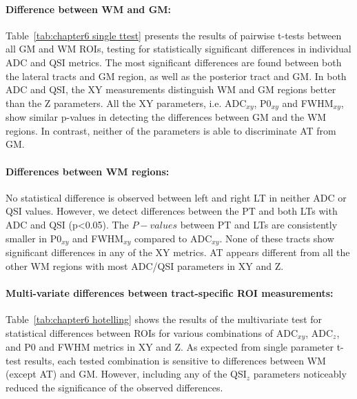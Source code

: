 \paragraph{Difference between WM and GM: }
Table~\ref{tab:chapter6 single ttest} presents the results of pairwise t-tests between all GM and WM \glspl{ROI}, testing for statistically significant differences in individual ADC and QSI metrics. The most significant differences are found between both the lateral tracts and GM region, as well as the posterior tract and GM. In both ADC and QSI, the XY measurements distinguish WM and GM regions better than the Z parameters. All the XY parameters, i.e. ADC$_{xy}$, P0$_{xy}$ and FWHM$_{xy}$, show similar p-values in detecting the differences between GM and the WM regions. In contrast, neither of the parameters is able to discriminate AT from GM.

\paragraph{Differences between WM regions: }
No statistical difference is observed between left and right LT in neither ADC or QSI values. However, we detect differences between the PT and both LTs with ADC and QSI (p<0.05). The $P-values$ between PT and LTs are consistently smaller in P0$_{xy}$ and FWHM$_{xy}$ compared to ADC$_{xy}$. None of these tracts show significant differences in any of the XY metrics. AT appears different from all the other WM regions with  most ADC/QSI parameters in XY and Z.

\paragraph*{Multi-variate differences between tract-specific ROI measurements: }
Table~\ref{tab:chapter6 hotelling} shows the results of the multivariate test for statistical differences between \glspl{ROI} for various combinations of ADC$_{xy}$, ADC$_{z}$, and P0 and FWHM metrics in XY and Z. As expected from single parameter t-test results, each tested combination is sensitive to differences between WM (except AT) and GM. However, including any of the QSI$_z$ parameters noticeably reduced the significance of the observed differences.

